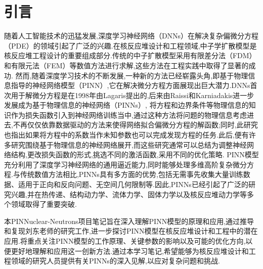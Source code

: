 \documentclass{Sichuan Normal University}
\begin{document}


\maketitle
\newpage
\tableofcontents  %
\clearpage %

\listoffigures %

\newpage
\section*{引言}
随着人工智能技术的迅猛发展,深度学习神经网络（DNNs）在解决复杂偏微分方程（PDE）的领域引起了广泛的兴趣.在核反应堆设计和工程领域,中子学扩散模型是核反应堆工程设计的重要组成部分.传统的中子扩散模型采用有限差分法（FDM）和有限元法（FEM）等数值方法进行求解,这些方法在工程实践中取得了显著的成功.
然而,随着深度学习技术的不断发展,一种新的方法已经崭露头角,即基于物理信息指导的神经网络模型（PINN）,它在解决微分方程方面展现出巨大潜力.DNNs首次用于解微分方程是在1998年由Lagaris提出的\cite{lagarisArtificialNeuralNetworks1998},后来由Raissi和Karniadakis进一步发展成为基于物理信息的神经网络（PINNs）\cite{raissiPhysicsinformedNeuralNetworks2019},
将方程和边界条件等物理信息的知识作为损失函数引入到神经网络训练当中,通过这种方法将问题的物理信息考虑进去,不再仅仅依靠数据驱动的方法来使得网络拟合偏微分方程的解函数;同时,此研究也指出如果将方程中的系数当作未知参数也可以完成发现方程的任务.此后,便有许多研究围绕基于物理信息的神经网络展开,而这些研究通常可以总结为调整神经网络结构,更改损失函数的形式,挑选不同的激活函数,采用不同的优化策略.
PINN模型充分利用了深度学习神经网络的通用逼近能力,同时能够处理多维高阶复杂微分方程.与传统数值方法相比,PINNs具有多方面的优势,包括无需事先收集大量训练数据、适用于正向和反向问题、无空间几何限制等.因此,PINNs已经引起了广泛的研究兴趣,并在热传递、结构动力学、流体力学、固体力学以及核反应堆动力学等多个领域取得了重要突破.

本PINNuclear-Neutrons项目笔记旨在深入理解PINN模型的原理和应用,通过推导和复现刘东老师的研究工作\cite{LiuDongJiYuPINNShenDuJiQiXueXiJiShuQiuJieDuoWeiZhongZiXueKuoSanFangCheng2022},进一步探讨PINN模型在核反应堆设计和工程中的潜在应用.将重点关注PINN模型的工作原理、关键参数的影响以及可能的优化方向,以便更好地理解和应用这一创新方法.通过本学习笔记,希望能够为核反应堆设计和工程领域的研究人员提供有关PINNs的深入见解,以应对复杂问题和挑战.
\end{document}
